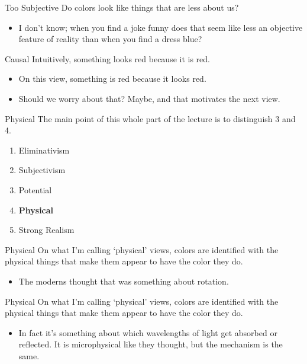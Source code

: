 \documentclass[
  17pt,
  letterpaper,
  ignorenonframetext,
  aspectratio=169,
]{beamer}
\providecommand{\tightlist}{%
  \setlength{\itemsep}{0pt}\setlength{\parskip}{0pt}}\usepackage{longtable,booktabs,array}
\begin{document}
\begin{frame}{Too Subjective}
\protect\hypertarget{too-subjective}{}
Do colors look like things that are less about us?

\begin{itemize}[<+->]
\tightlist
\item
  I don't know; when you find a joke funny does that seem like less an
  objective feature of reality than when you find a dress blue?
\end{itemize}
\end{frame}

\begin{frame}{Causal}
\protect\hypertarget{causal}{}
Intuitively, something looks red because it is red.

\begin{itemize}[<+->]
\tightlist
\item
  On this view, something is red because it looks red.
\item
  Should we worry about that? Maybe, and that motivates the next view.
\end{itemize}
\end{frame}

\begin{frame}{Physical}
\protect\hypertarget{physical}{}
The main point of this whole part of the lecture is to distinguish 3 and
4.

\begin{enumerate}[<+->]
\tightlist
\item
  Eliminativism
\item
  Subjectivism
\item
  Potential
\item
  \textbf{Physical}
\item
  Strong Realism
\end{enumerate}
\end{frame}

\begin{frame}{Physical}
\protect\hypertarget{physical-1}{}
On what I'm calling `physical' views, colors are identified with the
physical things that make them appear to have the color they do.

\begin{itemize}[<+->]
\tightlist
\item
  The moderns thought that was something about rotation.
\end{itemize}
\end{frame}

\begin{frame}{Physical}
\protect\hypertarget{physical-2}{}
On what I'm calling `physical' views, colors are identified with the
physical things that make them appear to have the color they do.

\begin{itemize}[<+->]
\tightlist
\item
  In fact it's something about which wavelengths of light get absorbed
  or reflected. It is microphysical like they thought, but the mechanism
  is the same.
\end{itemize}
\end{frame}
\end{document}
